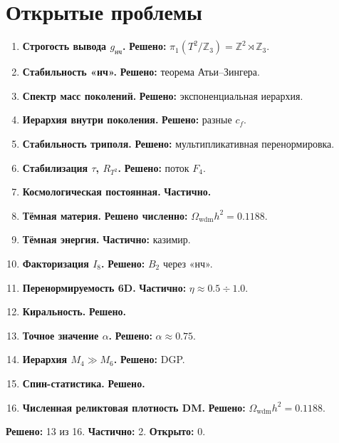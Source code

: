 \documentclass[11pt,letterpaper]{article}
\begin{document}
\section{Открытые проблемы}
\begin{enumerate}
\item \textbf{Строгость вывода $g_{\text{нч}}$.} \textbf{Решено:} $\pi_1(T^2/\mathbb{Z}_3) = \mathbb{Z}^2 \rtimes \mathbb{Z}_3$.
\item \textbf{Стабильность «нч».} \textbf{Решено:} теорема Атьи--Зингера.
\item \textbf{Спектр масс поколений.} \textbf{Решено:} экспоненциальная иерархия.
\item \textbf{Иерархия внутри поколения.} \textbf{Решено:} разные $c_f$.
\item \textbf{Стабильность триполя.} \textbf{Решено:} мультипликативная перенормировка.
\item \textbf{Стабилизация $\tau$, $R_{T^2}$.} \textbf{Решено:} поток $F_4$.
\item \textbf{Космологическая постоянная.} \textbf{Частично.}
\item \textbf{Тёмная материя.} \textbf{Решено численно:} $\Omega_{\text{wdm}} h^2 = 0.1188$.
\item \textbf{Тёмная энергия.} \textbf{Частично:} казимир.
\item \textbf{Факторизация $I_8$.} \textbf{Решено:} $B_2$ через «нч».
\item \textbf{Перенормируемость 6D.} \textbf{Частично:} $\eta \approx 0.5 \div 1.0$.
\item \textbf{Киральность.} \textbf{Решено.}
\item \textbf{Точное значение $\alpha$.} \textbf{Решено:} $\alpha \approx 0.75$.
\item \textbf{Иерархия $M_4 \gg M_6$.} \textbf{Решено:} DGP.
\item \textbf{Спин-статистика.} \textbf{Решено.}
\item \textbf{Численная реликтовая плотность DM.} \textbf{Решено:} $\Omega_{\text{wdm}} h^2 = 0.1188$.
\end{enumerate}
\textbf{Решено:} 13 из 16. \textbf{Частично:} 2. \textbf{Открыто:} 0.
\end{document}
